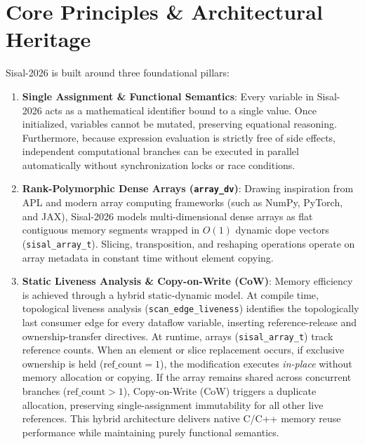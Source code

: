 \section{Core Principles \& Architectural Heritage}
Sisal-2026 is built around three foundational pillars:
\begin{enumerate}
    \item \textbf{Single Assignment \& Functional Semantics}: Every variable in Sisal-2026 acts as a mathematical identifier bound to a single value. Once initialized, variables cannot be mutated, preserving equational reasoning. Furthermore, because expression evaluation is strictly free of side effects, independent computational branches can be executed in parallel automatically without synchronization locks or race conditions.
    
    \item \textbf{Rank-Polymorphic Dense Arrays (\texttt{array\_dv})}: Drawing inspiration from APL \cite{iverson1962} and modern array computing frameworks (such as NumPy, PyTorch, and JAX), Sisal-2026 models multi-dimensional dense arrays as flat contiguous memory segments wrapped in $O(1)$ dynamic dope vectors (\texttt{sisal\_array\_t}). Slicing, transposition, and reshaping operations operate on array metadata in constant time without element copying.
    
    \item \textbf{Static Liveness Analysis \& Copy-on-Write (CoW)}: Memory efficiency is achieved through a hybrid static-dynamic model. At compile time, topological liveness analysis (\texttt{scan\_edge\_liveness}) identifies the topologically last consumer edge for every dataflow variable, inserting reference-release and ownership-transfer directives. At runtime, arrays (\texttt{sisal\_array\_t}) track reference counts. When an element or slice replacement occurs, if exclusive ownership is held ($\text{ref\_count} = 1$), the modification executes \emph{in-place} without memory allocation or copying. If the array remains shared across concurrent branches ($\text{ref\_count} > 1$), Copy-on-Write (CoW) triggers a duplicate allocation, preserving single-assignment immutability for all other live references. This hybrid architecture delivers native C/C++ memory reuse performance while maintaining purely functional semantics.
\end{enumerate}

